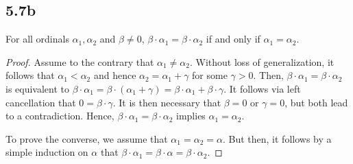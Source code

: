 \subsection*{5.7b} For all ordinals $\alpha_1, \alpha_2$ and $\beta \neq 0$, $\beta \cdot \alpha_1 = \beta \cdot \alpha_2$ if and only if $\alpha_1 = \alpha_2$.

\begin{proof}
    Assume to the contrary that $\alpha_1 \neq \alpha_2$. Without loss of generalization, it follows that $\alpha_1 < \alpha_2$ and hence $\alpha_2 = \alpha_1 + \gamma$ for some $\gamma > 0$. Then, $\beta \cdot \alpha_1 = \beta \cdot \alpha_2$ is equivalent to $\beta \cdot \alpha_1 = \beta \cdot (\alpha_1 + \gamma) = \beta \cdot \alpha_1 + \beta \cdot \gamma$. It follows via left cancellation that $0 = \beta \cdot \gamma$. It is then necessary that $\beta = 0$ or $\gamma=0$, but both lead to a contradiction. Hence, $\beta \cdot \alpha_1 = \beta \cdot \alpha_2$ implies $\alpha_1 = \alpha_2$.

    \vspace{1em}

    To prove the converse, we assume that $\alpha_1 = \alpha_2 = \alpha$. But then, it follows by a simple induction on $\alpha$ that $\beta \cdot \alpha_1 = \beta \cdot \alpha = \beta \cdot \alpha_2$.

    
\end{proof}

